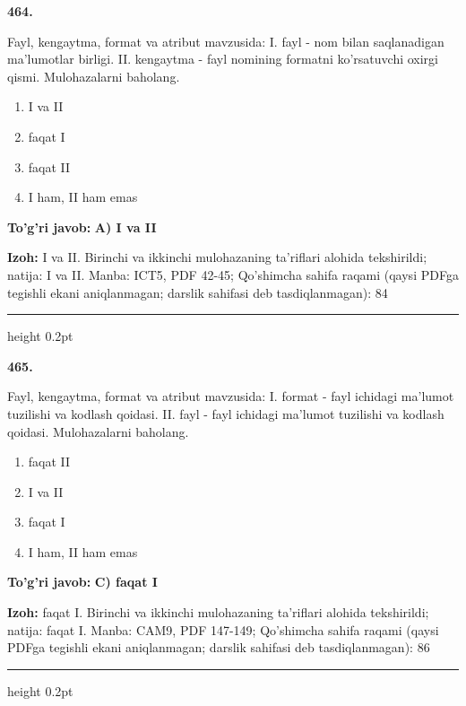 \documentclass[10pt,a4paper]{article}
\begin{document}
{\bfseries\sffamily\color{ink} 464.}
\par
Fayl, kengaytma, format va atribut mavzusida: I. fayl - nom bilan saqlanadigan ma'lumotlar birligi. II. kengaytma - fayl nomining formatni ko'rsatuvchi oxirgi qismi. Mulohazalarni baholang.
\begin{enumerate}[label=\Alph*),leftmargin=9mm]
\item I va II
\item faqat I
\item faqat II
\item I ham, II ham emas
\end{enumerate}
\begin{tcolorbox}[enhanced,breakable,colback=teal!4,colframe=teal!60!black,boxrule=0.45pt,arc=1.2mm,left=2.7mm,right=2.7mm,top=1.8mm,bottom=1.8mm,before skip=2mm,after skip=2mm]
{\bfseries\sffamily\color{teal}To'g'ri javob:} \textbf{A) I va II}
\par\smallskip
{\bfseries Izoh:} I va II. Birinchi va ikkinchi mulohazaning ta'riflari alohida tekshirildi; natija: I va II. Manba: ICT5, PDF 42-45; Qo'shimcha sahifa raqami (qaysi PDFga tegishli ekani aniqlanmagan; darslik sahifasi deb tasdiqlanmagan): 84
\end{tcolorbox}
\vspace{2mm}\hrule height 0.2pt\vspace{3mm}

{\bfseries\sffamily\color{ink} 465.}
\par
Fayl, kengaytma, format va atribut mavzusida: I. format - fayl ichidagi ma'lumot tuzilishi va kodlash qoidasi. II. fayl - fayl ichidagi ma'lumot tuzilishi va kodlash qoidasi. Mulohazalarni baholang.
\begin{enumerate}[label=\Alph*),leftmargin=9mm]
\item faqat II
\item I va II
\item faqat I
\item I ham, II ham emas
\end{enumerate}
\begin{tcolorbox}[enhanced,breakable,colback=teal!4,colframe=teal!60!black,boxrule=0.45pt,arc=1.2mm,left=2.7mm,right=2.7mm,top=1.8mm,bottom=1.8mm,before skip=2mm,after skip=2mm]
{\bfseries\sffamily\color{teal}To'g'ri javob:} \textbf{C) faqat I}
\par\smallskip
{\bfseries Izoh:} faqat I. Birinchi va ikkinchi mulohazaning ta'riflari alohida tekshirildi; natija: faqat I. Manba: CAM9, PDF 147-149; Qo'shimcha sahifa raqami (qaysi PDFga tegishli ekani aniqlanmagan; darslik sahifasi deb tasdiqlanmagan): 86
\end{tcolorbox}
\vspace{2mm}\hrule height 0.2pt\vspace{3mm}
\end{document}
